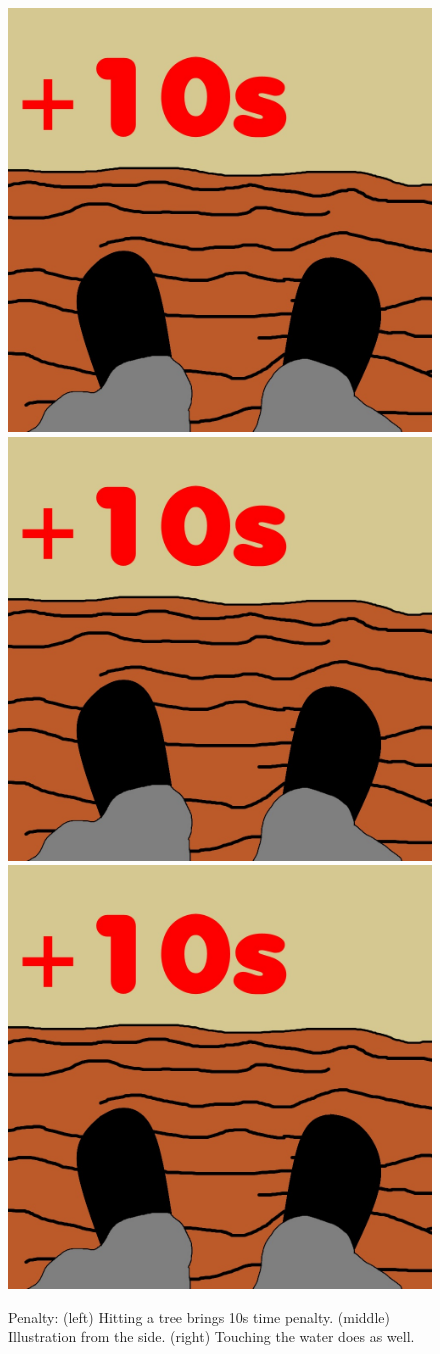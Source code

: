 \documentclass{sigchi}
\begin{document}
  \begin{figure}[!htb]
    \centering
    \includegraphics[width=0.32\linewidth]{Image_6.jpg}
    \includegraphics[width=0.32\linewidth]{Image_6.jpg}
    \includegraphics[width=0.32\linewidth]{Image_6.jpg}
    \caption{Penalty: (left) Hitting a tree brings 10s time penalty. (middle) Illustration from the side. (right) Touching the water does as well.}
  \end{figure}
\end{document}
